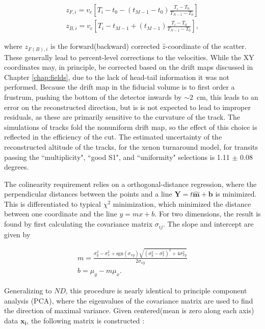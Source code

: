 \begin{enumerate}
    \begin{align}
        z_{F,i} = v_e[T_i-t_0 -  (t_{M-1}-t_0)\frac{T_i - T_0}{T_{N-1}-T_0}]\\
         z_{B,i} = v_e[T_i-t_{M-1} +  (t_{M-1})\frac{T_i - T_0}{T_{N-1}-T_0}],
    \end{align}
    
    where $z_{F(B),i}$ is the forward(backward) corrected $\hat z$-coordinate of the scatter. 
    These generally lead to percent-level corrections to the velocities.
    While the XY coordinates may, in principle, be corrected based on the drift maps discussed in Chapter \ref{chap:fields}, due to the lack of head-tail information it was not performed.
    Because the drift map in the fiducial volume is to first order a frustrum, pushing the bottom of the detector inwards by $\sim 2$~cm, this leads to an error on the reconstructed direction, but is is not expected to lead to improper residuals, as these are primarily sensitive to the curvature of the track.
    The simulations of tracks fold the nonuniform drift map, so the effect of this choice is reflected in the efficiency of the cut.
    The estimated uncertainty of the reconstructed altitude of the tracks, for the xenon turnaround model, for transits passing the ``multiplicity",  ``good S1", and ``uniformity" selections is 1.11 $\pm$ 0.08 degrees. 
    
    The colinearity requirement relies on a orthogonal-distance regression\cite{ gavin_hp_total_2017}, where the perpendicular distances between the points and a line $\mathbf{Y} = t \hat{\mathbf{m}} + \mathbf{b}$ is minimized.
    This is differentiated to typical $\chi^2$ minimization, which minimized the distance between one coordinate and the line $y = mx + b$.
    For two dimensions, the result is found by first calculating the covariance matrix $\sigma_{ij}$.
    The slope and intercept are given by\cite{greene_generalized_2013}
    
    \begin{align}
        m = \frac{\sigma_y^2 - \sigma_x^2 + \text{sgn} (\sigma_{xy}) \sqrt{(\sigma_y^2 - \sigma_x^2)^2 + 4 \sigma^2_{xy}}}{2 \sigma_{xy}}\\
    b = \mu_y - m \mu_x.
    \end{align}
    
    Generalizing to $ND$, this procedure is nearly identical to principle component analysis (PCA), where the eigenvalues of the covariance matrix are used to find the direction of maximal variance.
    Given centered(mean is zero along each axis) data $\mathbf{x_i}$, the following matrix is constructed \cite{greene_generalized_2013}:
    

\end{enumerate}

